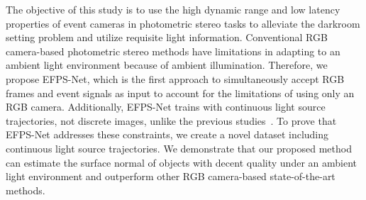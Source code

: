 The objective of this study is to use the high dynamic range and low latency properties of event cameras in photometric stereo tasks to alleviate the darkroom setting problem and utilize requisite light information. Conventional RGB camera-based photometric stereo methods have limitations in adapting to an ambient light environment because of ambient illumination. Therefore, we propose EFPS-Net, which is the first approach to simultaneously accept RGB frames and event signals as input to account for the limitations of using only an RGB camera. Additionally, EFPS-Net trains with continuous light source trajectories, not discrete images, unlike the previous studies~\citep{santo2017deep,ikehata2018cnn,chen2018ps,logothetis2021px}. To prove that EFPS-Net addresses these constraints, we create a novel dataset including continuous light source trajectories. We demonstrate that our proposed method can estimate the surface normal of objects with decent quality under an ambient light environment and outperform other RGB camera-based state-of-the-art methods. %
